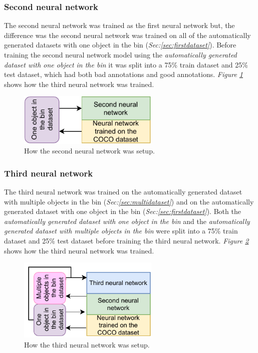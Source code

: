 \subsubsection{Second neural network}
The second neural network was trained as the first neural network but, the difference was the second neural network was trained on all of the automatically generated datasets with one object in the bin (\textit{Sec:\ref{sec:firstdataset}}). Before training the second neural network model using the \textit{automatically generated dataset with one object in the bin} it was split into a 75\% train dataset and 25\% test dataset, which had both bad annotations and good annotations. \textit{Figure \ref{fig:secondneural}} shows how the third neural network was trained.


\begin{figure}[h]
 \centering
 \includegraphics[width=0.6\textwidth]{graphics/results/secondneural.pdf}
 \caption{How the second neural network was setup.}
 \label{fig:secondneural}
\end{figure}

\subsubsection{Third neural network}
The third neural network was trained on the automatically generated dataset with multiple objects in the bin (\textit{Sec:\ref{sec:multidataset}}) and on the automatically generated dataset with one object in the bin (\textit{Sec:\ref{sec:firstdataset}}). Both the \textit{automatically generated dataset with one object in the bin} and the \textit{automatically generated dataset with multiple objects in the bin} were split into a 75\% train dataset and 25\% test dataset before training the third neural network. \textit{Figure \ref{fig:thirdneural}} shows how the third neural network was trained.

\begin{figure}[h]
 \centering
 \includegraphics[width=0.6\textwidth]{graphics/results/thirdneural.pdf}
 \caption{How the third neural network was setup.}
 \label{fig:thirdneural}
\end{figure}
